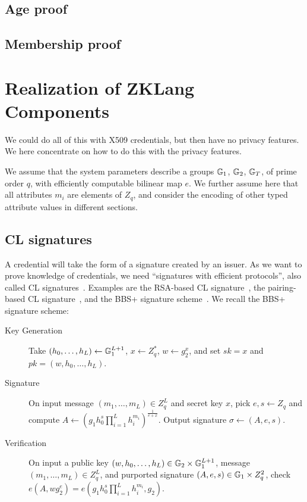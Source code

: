 \subsection{Age proof}


\subsection{Membership proof}



\section{Realization of ZKLang Components}
We could do all of this with X509 credentials, but then have no privacy features. 
We here concentrate on how to do this with the privacy features.


We assume that the system parameters describe a groups $\mathbb{G}_1$, $\mathbb{G}_2$, $\mathbb{G}_T$, of prime order $q$, with efficiently computable bilinear map $e$.
We further assume here that all attributes $m_i$ are elements of $Z_q$, and consider the encoding of other typed attribute values in different sections.

\subsection{CL signatures}
A credential will take the form of a signature created by an issuer. 
As we want to prove knowledge of credentials, we need ``signatures with efficient protocols'', also called CL signatures~\cite{camlys02b}. 
Examples are the RSA-based CL signature~\cite{camlys02b}, the pairing-based CL signature~\cite{camlys04},
and the BBS+ signature scheme~\cite{bobosh04,ASMC13}. 
We recall the BBS+ signature scheme:
\begin{description}
\item[Key Generation] Take $(h_0, \ldots, h_L) \gets \mathbb{G}_1^{L+1}$, $x \gets Z_q^*$, $w \gets g_2^x$, and set $sk = x$ and $pk = (w, h_0, \ldots, h_L)$.
\item[Signature] On input message $(m_1, \ldots, m_L) \in Z_q^L$ and secret key $x$, 
pick $e, s \gets Z_q$ and compute $A \gets (g_1 h_0^s \prod_{i = 1}^{L} h_i^{m_{i}})^{\frac{1}{e+x}}$.
Output signature $\sigma \gets (A, e, s)$.
\item[Verification] On input a public key $(w, h_0, \ldots, h_L) \in \mathbb{G}_2 \times \mathbb{G}_1^{L+1}$, 
message $(m_1, \ldots, m_L) \in Z_q^L$, and purported signature $(A, e, s) \in \mathbb{G}_1 \times Z_q^2$, 
check $e(A, w g_2^e) = e(g_1 h_0^s \prod_{i = 1}^{L} h_i^{m_{i}}, g_2)$.
\end{description}


